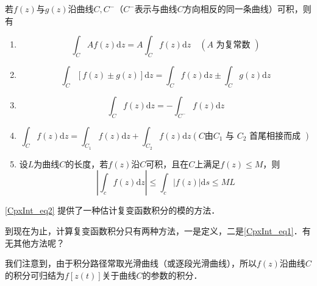 若$ f (z)$与$g (z)$沿曲线$C,C^-$（$C^-$表示与曲线$C$方向相反的同一条曲线）可积，则有
\begin{enumerate}
\item \begin{equation}
\int_{C} A f(z) \mathrm{d} z=A \int_{C} f(z) \mathrm{d} z \quad(A \text { 为复常数 })
\end{equation}
\item \begin{equation}
\int_{C}[f(z) \pm g(z)] \mathrm{d} z=\int_{C} f(z) \mathrm{d} z \pm \int_{C} g(z) \mathrm{d} z
\end{equation}
\item \begin{equation} 
\int_{C} f(z) \mathrm{d} z=-\int_{C^{-}} f(z) \mathrm{d} z
\end{equation}
\item \begin{equation}
\int_{C} f(z) \mathrm{d} z=\int_{C_{1}} f(z) \mathrm{d} z+\int_{C_{2}} f(z) \mathrm{d} z\left(C\text{由} C_{1} \text { 与 } C_{2} \text { 首尾相接而成 }\right)
\end{equation}
\item 设$ L$为曲线$C$的长度，若$ f (z)$沿$C$可积，且在$C$上满足$ f (z) \leqslant M $，则
\begin{equation} \label{CpxInt_eq2}
\left|\int_{c} f(z) \mathrm{d} z\right| \leqslant \int_{c}|f(z)| \mathrm{d} s \leqslant M L
\end{equation}
\end{enumerate}

\autoref{CpxInt_eq2} 提供了一种估计复变函数积分的模的方法．

到现在为止，计算复变函数积分只有两种方法，一是定义，二是\autoref{CpxInt_eq1}．有无其他方法呢？

我们注意到，由于积分路径常取光滑曲线（或逐段光滑曲线），所以$ f (z) $沿曲线$C $的积分可归结为$f [z(t)]$关于曲线$C$的参数的积分．

